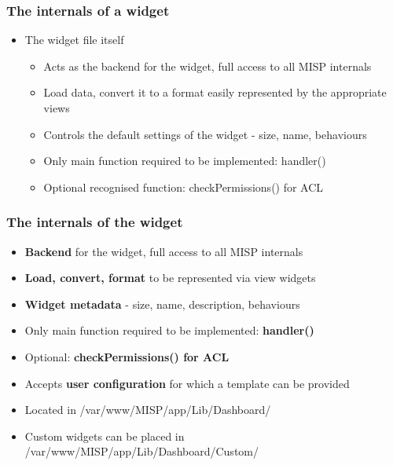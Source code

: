 \begin{frame}
  \frametitle{The internals of a widget}
  \begin{itemize}
        \item The widget file itself
        \begin{itemize}
            \item Acts as the backend for the widget, full access to all MISP internals
            \item Load data, convert it to a format easily represented by the appropriate views
            \item Controls the default settings of the widget - size, name, behaviours
            \item Only main function required to be implemented: handler()
            \item Optional recognised function: checkPermissions() for ACL
        \end{itemize}
  \end{itemize}
\end{frame}

\begin{frame}
  \frametitle{The internals of the widget}
        \begin{itemize} 
            \item {\bf Backend} for the widget, full access to all MISP internals
            \item {\bf Load, convert, format} to be represented via view widgets
            \item {\bf Widget metadata} - size, name, description, behaviours
            \item Only main function required to be implemented: {\bf handler()}
            \item Optional: {\bf checkPermissions() for ACL}
            \item Accepts {\bf user configuration} for which a template can be provided
            \item Located in /var/www/MISP/app/Lib/Dashboard/
            \item Custom widgets can be placed in /var/www/MISP/app/Lib/Dashboard/Custom/
        \end{itemize}
\end{frame}

